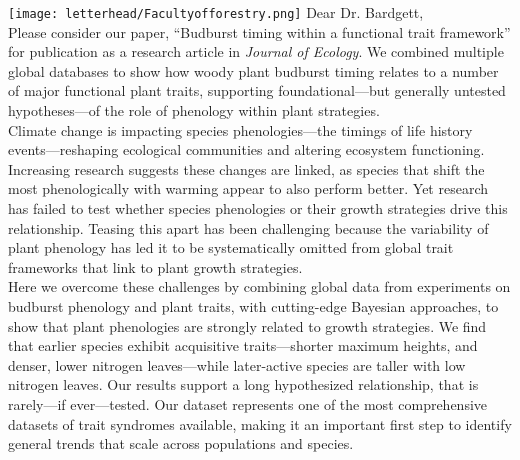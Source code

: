 \documentclass[11pt,a4paper]{article}
\begin{document}
\noindent \texttt{[image: letterhead/Facultyofforestry.png]}
\noindent Dear Dr. Bardgett,
\vspace{1.5ex}\\
\noindent Please consider our paper, ``Budburst timing within a functional trait framework'' for publication as a research article in \emph{Journal of Ecology}. We combined multiple global databases to show how woody plant budburst timing relates to a number of major functional plant traits, supporting foundational---but generally untested hypotheses---of the role of phenology within plant strategies. 
\vspace{1.5ex}\\ 
\noindent Climate change is impacting species phenologies---the timings of life history events---reshaping ecological communities and altering ecosystem functioning. Increasing research suggests these changes are linked, as species that shift the most phenologically with warming appear to also perform better. Yet research has failed to test whether species phenologies or their growth strategies drive this relationship. Teasing this apart has been challenging because the variability of plant phenology has led it to be systematically omitted from global trait frameworks that link to plant growth strategies. %
\vspace{1.5ex}\\
Here we overcome these challenges by combining global data from experiments on budburst phenology and plant traits, with cutting-edge Bayesian approaches, to show that plant phenologies are strongly related to growth strategies. We find that earlier species exhibit acquisitive traits---shorter maximum heights, and denser, lower nitrogen leaves---while later-active species are taller with low nitrogen leaves. Our results support a long hypothesized relationship, that is rarely---if ever---tested. Our dataset represents one of the most comprehensive datasets of trait syndromes available, making it an important first step to identify general trends that scale across populations and species. 
\vspace{1.5ex}\\
\end{document}
